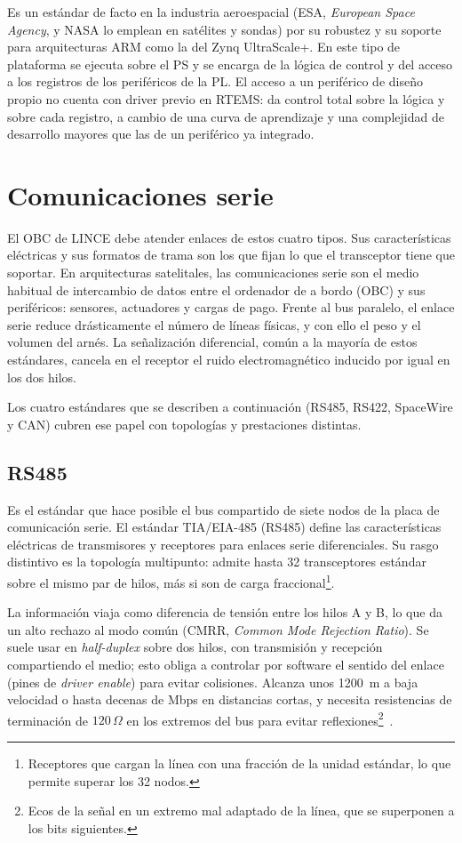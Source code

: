 Es un estándar de facto en la industria aeroespacial (ESA, \textit{European Space Agency}, y NASA
lo emplean en satélites y sondas) por su robustez y su soporte para arquitecturas ARM como la del
Zynq UltraScale+. En
este tipo de plataforma se ejecuta sobre el PS y se encarga de la lógica de control y del acceso
a los registros de los periféricos de la PL. El acceso a un periférico de diseño propio no
cuenta con driver previo en RTEMS: da control total sobre la lógica y sobre cada registro, a
cambio de una curva de aprendizaje y una complejidad de desarrollo mayores que las de un
periférico ya integrado.

\section{Comunicaciones serie}

El OBC de LINCE debe atender enlaces de estos cuatro tipos. Sus características eléctricas y
sus formatos de trama son los que fijan lo que el transceptor tiene que soportar. En arquitecturas satelitales, las comunicaciones serie son el medio habitual de intercambio de
datos entre el ordenador de a bordo (OBC) y sus periféricos: sensores, actuadores y cargas de
pago. Frente al bus paralelo, el enlace serie reduce drásticamente el número de líneas físicas,
y con ello el peso y el volumen del arnés. La señalización diferencial, común a la mayoría de
estos estándares, cancela en el receptor el ruido electromagnético inducido por igual en los dos
hilos.

Los cuatro estándares que se describen a continuación (RS485, RS422, SpaceWire y CAN) cubren ese
papel con topologías y prestaciones distintas.

\subsection{RS485}

Es el estándar que hace posible el bus compartido de siete nodos de la placa de comunicación
serie. El estándar TIA/EIA-485 (RS485) define las características eléctricas de transmisores y
receptores para enlaces serie diferenciales. Su rasgo distintivo es la topología multipunto:
admite hasta 32 transceptores estándar sobre el mismo par de hilos, más si son de carga
fraccional\footnote{Receptores que cargan la línea con una fracción de la unidad estándar, lo que permite superar los 32 nodos.}.

La información viaja como diferencia de tensión entre los hilos A y B, lo que da un alto rechazo
al modo común (CMRR, \textit{Common Mode Rejection Ratio}). Se suele usar en \textit{half-duplex} sobre dos hilos, con transmisión y recepción
compartiendo el medio; esto obliga a controlar por software el sentido del enlace (pines de
\textit{driver enable}) para evitar colisiones. Alcanza unos 1200~m a baja velocidad o hasta
decenas de Mbps en distancias cortas, y necesita resistencias de terminación de $120\,\Omega$ en
los extremos del bus para evitar reflexiones\footnote{Ecos de la señal en un extremo mal adaptado de la línea, que se superponen a los bits siguientes.}~\cite{ti2014rs485,eia485a}.

